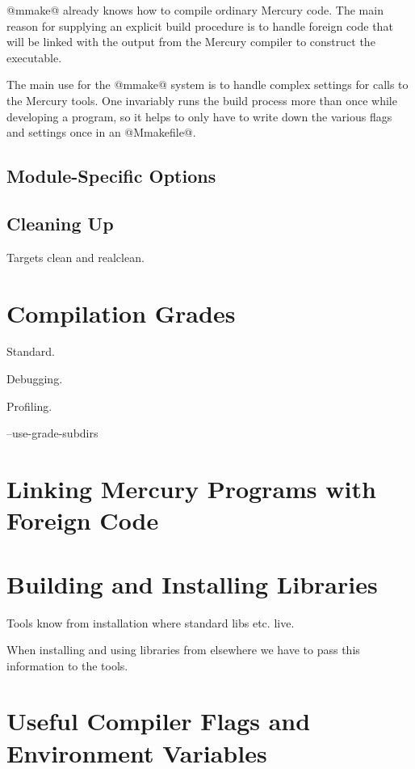 @mmake@ already knows how to compile ordinary Mercury code.  The main
reason for supplying an explicit build procedure is to handle foreign
code that will be linked with the output from the Mercury compiler to
construct the executable.

The main use for the @mmake@ system is to handle complex settings
for calls to the Mercury tools.  One invariably runs the
build process more than once while developing a program, so it
helps to only have to write down the various flags and settings
once in an @Mmakefile@.

\subsection{Module-Specific Options}

\subsection{Cleaning Up}

Targets clean and realclean.

\section{Compilation Grades}

Standard.

Debugging.

Profiling.

--use-grade-subdirs

\section{Linking Mercury Programs with Foreign Code}

\section{Building and Installing Libraries}

Tools know from installation where standard libs etc. live.

When installing and using libraries from elsewhere we have to pass
this information to the tools.


\section{Useful Compiler Flags and Environment Variables}
